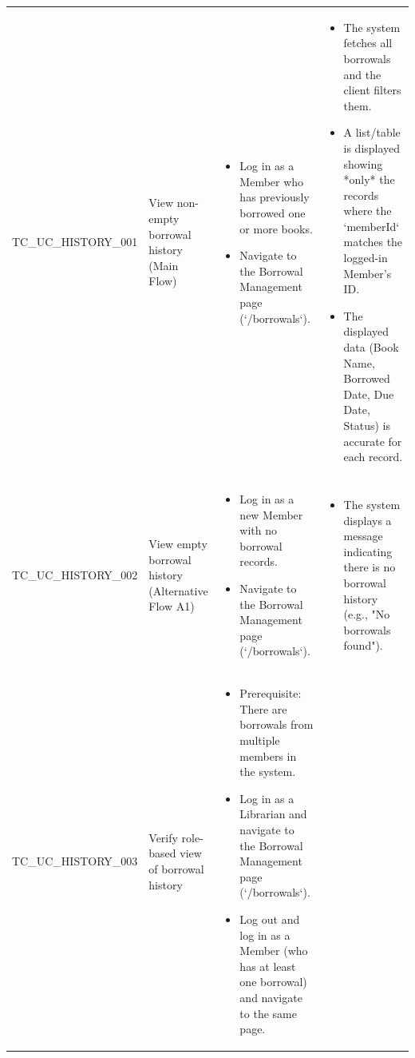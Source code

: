 \begin{longtable}{|>{\scriptsize\raggedright\arraybackslash}p{3.5cm}|>{\raggedright\arraybackslash}p{3.5cm}|>{\raggedright\arraybackslash}p{4cm}|>{\raggedright\arraybackslash}p{4cm}|}
\multicolumn{4}{|l|}{\textbf{Sub-Section: UC-005: View Borrowal History (Member) }} \\ \hline
TC\_UC\_HISTORY\_001 & View non-empty borrowal history (Main Flow) & 
    \begin{itemize}[noitemsep, topsep=0pt, partopsep=0pt, leftmargin=*]
        \item Log in as a Member who has previously borrowed one or more books.
        \item Navigate to the Borrowal Management page (`/borrowals`).
    \end{itemize} & 
    \begin{itemize}[noitemsep, topsep=0pt, partopsep=0pt, leftmargin=*]
        \item The system fetches all borrowals and the client filters them.
        \item A list/table is displayed showing *only* the records where the `memberId` matches the logged-in Member's ID.
        \item The displayed data (Book Name, Borrowed Date, Due Date, Status) is accurate for each record.
    \end{itemize} \\ \hline
TC\_UC\_HISTORY\_002 & View empty borrowal history (Alternative Flow A1) & 
    \begin{itemize}[noitemsep, topsep=0pt, partopsep=0pt, leftmargin=*]
        \item Log in as a new Member with no borrowal records.
        \item Navigate to the Borrowal Management page (`/borrowals`).
    \end{itemize} & 
    \begin{itemize}[noitemsep, topsep=0pt, partopsep=0pt, leftmargin=*]
        \item The system displays a message indicating there is no borrowal history (e.g., "No borrowals found").
    \end{itemize} \\ \hline
TC\_UC\_HISTORY\_003 & Verify role-based view of borrowal history & 
    \begin{itemize}[noitemsep, topsep=0pt, partopsep=0pt, leftmargin=*]
        \item Prerequisite: There are borrowals from multiple members in the system.
        \item Log in as a Librarian and navigate to the Borrowal Management page (`/borrowals`).
        \item Log out and log in as a Member (who has at least one borrowal) and navigate to the same page.

\end{itemize}
\end{longtable}
